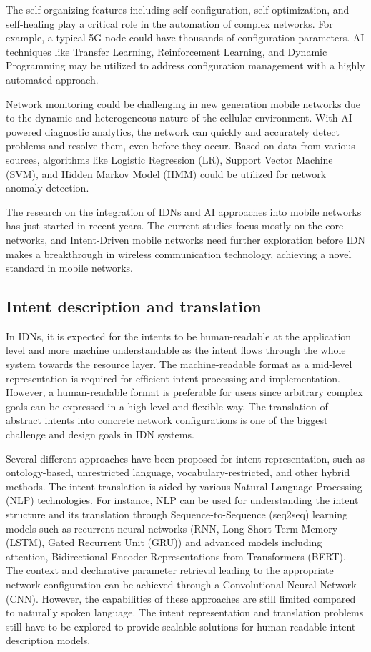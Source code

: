 The self-organizing features including self-configuration, self-optimization, and self-healing play a critical role in the automation of complex networks. For example, a typical 5G node could have thousands of configuration parameters. AI techniques like Transfer Learning, Reinforcement Learning, and Dynamic Programming may be utilized to address configuration management with a highly automated approach. \cite{anuradha2017empowering}

Network monitoring could be challenging in new generation mobile networks due to the dynamic and heterogeneous nature of the cellular environment. With AI-powered diagnostic analytics, the network can quickly and accurately detect problems and resolve them, even before they occur. Based on data from various sources, algorithms like Logistic Regression (LR), Support Vector Machine (SVM), and Hidden Markov Model (HMM) could be utilized for network anomaly detection.\cite{anuradha2017empowering}

The research on the integration of IDNs and AI approaches into mobile networks has just started in recent years. The current studies focus mostly on the core networks, and Intent-Driven mobile networks need further exploration before IDN makes a breakthrough in wireless communication technology, achieving a novel standard in mobile networks.


\subsection{Intent description and translation}
In IDNs, it is expected for the intents to be human-readable at the application level and more machine understandable as the intent flows through the whole system towards the resource layer. The machine-readable format as a mid-level representation is required for efficient intent processing and implementation. However, a human-readable format is preferable for users since arbitrary complex goals can be expressed in a high-level and flexible way. The translation of abstract intents into concrete network configurations is one of the biggest challenge and design goals in IDN systems.

Several different approaches have been proposed for intent representation, such as ontology-based, unrestricted language, vocabulary-restricted, and other hybrid methods. The intent translation is aided by various Natural Language Processing (NLP) technologies. For instance, NLP  can be used for understanding the intent structure and its translation through Sequence-to-Sequence (seq2seq) learning models such as recurrent neural networks (RNN, Long-Short-Term Memory (LSTM), Gated Recurrent Unit (GRU)) and advanced models including attention, Bidirectional Encoder Representations from Transformers (BERT). The context and declarative parameter retrieval leading to the appropriate network configuration can be achieved through a Convolutional Neural Network (CNN). However, the capabilities of these approaches are still limited compared to naturally spoken language. The intent representation and translation problems still have to be explored to provide scalable solutions for human-readable intent description models. \cite[18]{Mehmood2021} 


